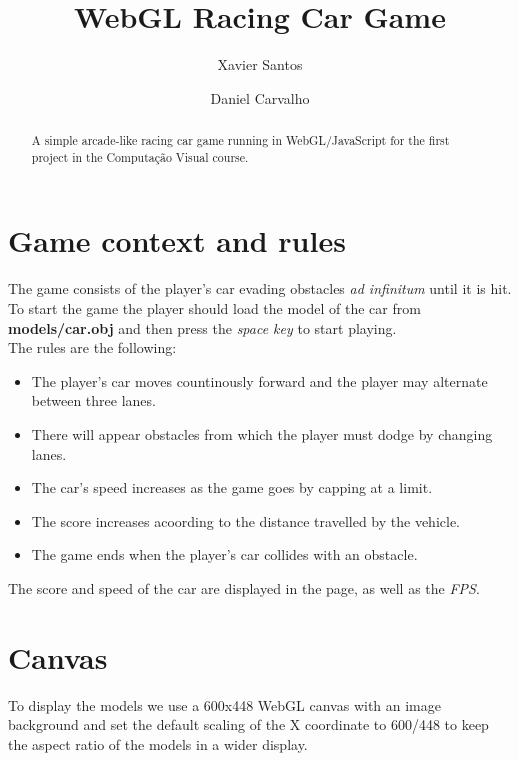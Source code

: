 \documentclass[english]{revdetua}
\begin{document}

\title{WebGL Racing Car Game}
\author{Xavier Santos \and Daniel Carvalho} %
\maketitle

\begin{abstract}
  A simple arcade-like racing car game running in WebGL/JavaScript for the first project in the Computação Visual course.
\end{abstract}

\section{Game context and rules}
The game consists of the player's car evading obstacles \textit{ad infinitum} until it is hit.
\\
To start the game the player should load the model of the car from \textbf{models/car.obj} and then press the \textit{space key} to start playing.
\\
The rules are the following:

\begin{itemize}
	\item The player's car moves countinously forward and the player may alternate between three lanes.
	\item There will appear obstacles from which the player must dodge by changing lanes.
	\item The car's speed increases as the game goes by capping at a limit.
	\item The score increases acoording to the distance travelled by the vehicle.
	\item The game ends when the player's car collides with an obstacle.
\end{itemize}

The score and speed of the car are displayed in the page, as well as the \textit{FPS}.

\section{Canvas}
To display the models we use a 600x448 WebGL canvas with an image background and set the default scaling of the X coordinate to 600/448 to keep the aspect ratio of the models in a wider display.
\end{document}
